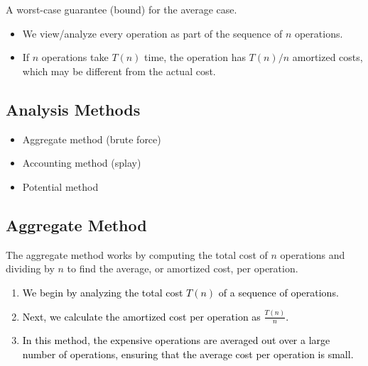 \begin{definition}
    A worst-case guarantee (bound) for the average case. 
    \begin{itemize}
        \item We view/analyze every operation as part of the sequence of $n$ operations. 
        \item If $n$ operations take $T(n)$ time, the operation has $T(n)/n$ amortized costs, which may be different from the actual cost.
    \end{itemize}
    \end{definition}
    
    \subsection{Analysis Methods}
    \begin{definition}
        \begin{itemize}
            \item Aggregate method (brute force)
            \item Accounting method (splay)
            \item Potential method
        \end{itemize}
    \end{definition}
    
    \subsection{Aggregate Method}
    \begin{process}
        The aggregate method works by computing the total cost of \( n \) operations and dividing by \( n \) to find the average, or amortized cost, per operation.

        \begin{enumerate}
            \item \textcolor{black}{We begin by analyzing the total cost $T(n)$ of a sequence of operations.}
            \item \textcolor{black}{Next, we calculate the amortized cost per operation as $\frac{T(n)}{n}$.}
            \item \textcolor{black}{In this method, the expensive operations are averaged out over a large number of operations, ensuring that the average cost per operation is small.}
        \end{enumerate}
    \end{process}
    
